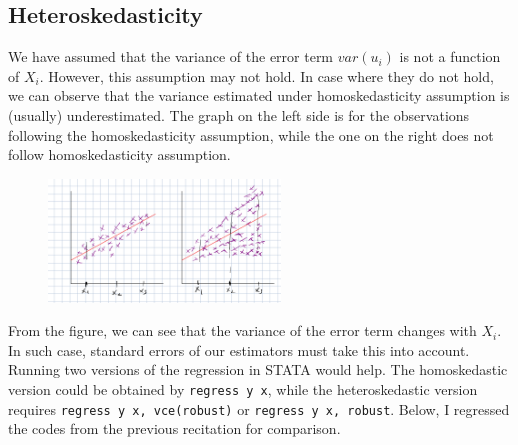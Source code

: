 \documentclass[12pt]{article}
\theoremstyle{definition}
\theoremstyle{property}
\theoremstyle{assumption}
\theoremstyle{example}
\theoremstyle{comment}
\begin{document}
\subsection{Heteroskedasticity}
We have assumed that the variance of the error term $var(u_i)$ is not a function of $X_i$. However, this assumption may not hold. In case where they do not hold, we can observe that the variance estimated under homoskedasticity assumption is (usually) underestimated. The graph on the left side is for the observations following the homoskedasticity assumption, while the one on the right does not follow homoskedasticity assumption.
\begin{figure}[H]
\centering
\includegraphics[width=0.55\textwidth]{hetero.png}
\end{figure}
\par\medskip
From the figure, we can see that the variance of the error term changes with $X_i$. In such case, standard errors of our estimators must take this into account. Running two versions of the regression in STATA would help. The homoskedastic version could be obtained by \texttt{regress y x}, while the heteroskedastic version requires \texttt{regress y x, vce(robust)} or \texttt{regress y x, robust}.  Below, I regressed the codes from the previous recitation for comparison. \par\medskip
\end{document}
